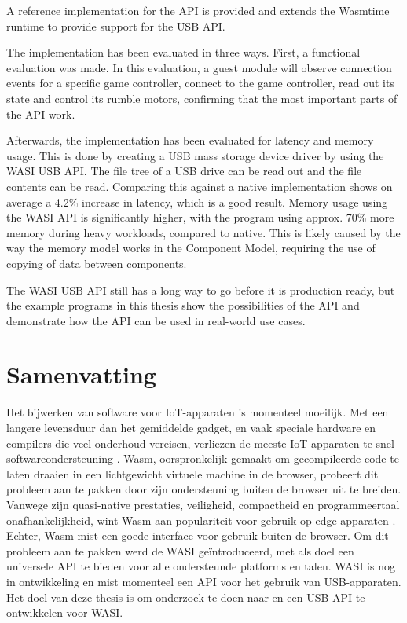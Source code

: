 A reference implementation for the \acrshort{API} is provided \cite{wasi_usb} and extends the Wasmtime \cite{wasmtime_website} runtime to provide support for the \acrshort{USB} \acrshort{API}.

The implementation has been evaluated in three ways. First, a functional evaluation was made. In this evaluation, a guest module will observe connection events for a specific game controller, connect to the game controller, read out its state and control its rumble motors, confirming that the most important parts of the \acrshort{API} work.

Afterwards, the implementation has been evaluated for latency and memory usage. This is done by creating a \acrshort{USB} mass storage device driver by using the \acrshort{WASI} \acrshort{USB} \acrshort{API}. The file tree of a \acrshort{USB} drive can be read out and the file contents can be read. Comparing this against a native implementation shows on average a 4.2\% increase in latency, which is a good result. Memory usage using the \acrshort{WASI} \acrshort{API} is significantly higher, with the program using approx. 70\% more memory during heavy workloads, compared to native. This is likely caused by the way the memory model works in the Component Model, requiring the use of copying of data between components.

The \acrshort{WASI} \acrshort{USB} \acrshort{API} still has a long way to go before it is production ready, but the example programs in this thesis show the possibilities of the \acrshort{API} and demonstrate how the \acrshort{API} can be used in real-world use cases.

\chapter*{Samenvatting}

Het bijwerken van software voor \acrfull{IoT}-apparaten is momenteel moeilijk. Met een langere levensduur dan het gemiddelde gadget, en vaak speciale hardware en compilers die veel onderhoud vereisen, verliezen de meeste \acrshort{IoT}-apparaten te snel softwareondersteuning \cite{wasi_iot}. \acrfull{Wasm}, oorspronkelijk gemaakt om gecompileerde code te laten draaien in een lichtgewicht virtuele machine in de browser, probeert dit probleem aan te pakken door zijn ondersteuning buiten de browser uit te breiden. Vanwege zijn quasi-native prestaties, veiligheid, compactheid en programmeertaal onafhankelijkheid, wint \acrshort{Wasm} aan populariteit voor gebruik op edge-apparaten \cite{wasi_iot}. Echter, \acrshort{Wasm} mist een goede interface voor gebruik buiten de browser. Om dit probleem aan te pakken werd de \acrfull{WASI} geïntroduceerd, met als doel een universele \acrshort{API} te bieden voor alle ondersteunde platforms en talen. \acrshort{WASI} is nog in ontwikkeling en mist momenteel een \acrshort{API} voor het gebruik van USB-apparaten. Het doel van deze thesis is om onderzoek te doen naar en een \acrshort{USB} \acrshort{API} te ontwikkelen voor \acrshort{WASI}.

